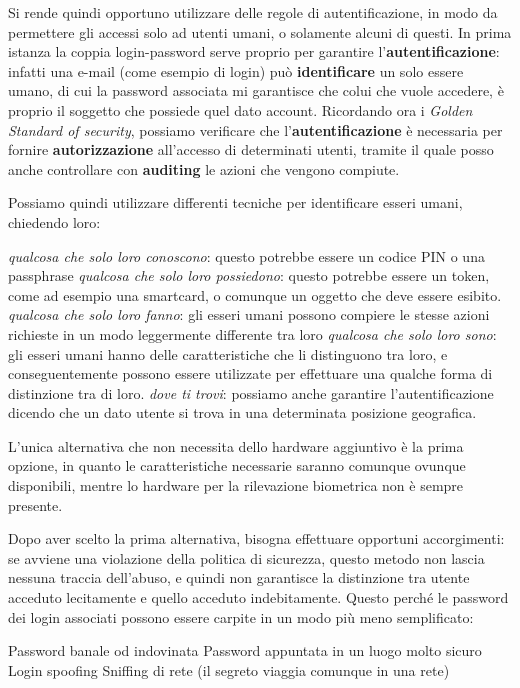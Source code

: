 Si rende quindi opportuno utilizzare delle regole di autentificazione, in modo
da permettere gli accessi solo ad utenti umani, o solamente alcuni di questi.
In prima istanza la coppia login-password serve proprio per garantire 
l'\textbf{autentificazione}: infatti una e-mail (come esempio di login) può 
\textbf{identificare} un solo essere umano, di cui la password associata mi garantisce 
che colui che vuole accedere, è proprio il soggetto che possiede quel dato account.
Ricordando ora i \textit{Golden Standard of security}, possiamo verificare che
l'\textbf{autentificazione} è necessaria per fornire \textbf{autorizzazione} all'accesso
di determinati utenti, tramite il quale posso anche controllare con \textbf{auditing}
le azioni che vengono compiute.

Possiamo quindi utilizzare differenti tecniche per identificare esseri umani,
chiedendo loro:
\begin{itemize}
\diam \textit{qualcosa che solo loro conoscono}: questo potrebbe essere un codice 
	PIN o una passphrase
\diam \textit{qualcosa che solo loro possiedono}: questo potrebbe essere un token,
	come ad esempio una smartcard, o comunque un oggetto che deve essere
	esibito.
\diam \textit{qualcosa che solo loro fanno}: gli esseri umani possono compiere le
	stesse azioni richieste in un modo leggermente differente tra loro
\diam \textit{qualcosa che solo loro sono}: gli esseri umani hanno delle caratteristiche
	che li distinguono tra loro, e conseguentemente possono essere utilizzate
	per effettuare una qualche forma di distinzione tra di loro.
\diam \textit{dove ti trovi}: possiamo anche garantire l'autentificazione dicendo
	che un dato utente si trova in una determinata posizione geografica.
\end{itemize}
L'unica alternativa che non necessita dello hardware aggiuntivo è la prima
opzione, in quanto le caratteristiche necessarie saranno comunque ovunque 
disponibili, mentre lo hardware per la rilevazione biometrica non è sempre
presente.


Dopo aver scelto la prima alternativa, bisogna effettuare opportuni accorgimenti:
se avviene una violazione della politica di sicurezza, questo metodo
non lascia nessuna traccia dell'abuso, e quindi non garantisce la distinzione
tra utente acceduto lecitamente e quello acceduto indebitamente. Questo
perché le password dei login associati possono essere carpite in un 
modo più meno semplificato:
\begin{itemize}
\diam Password banale od indovinata
\diam Password appuntata in un luogo molto sicuro
\diam Login spoofing
\diam Sniffing di rete (il segreto viaggia comunque in una rete)
\end{itemize}

